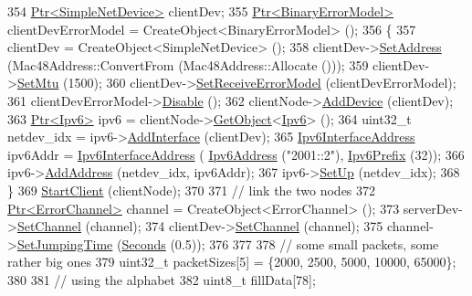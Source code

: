 \begin{DoxyCode}
354   \hyperlink{classns3_1_1Ptr}{Ptr<SimpleNetDevice>} clientDev;
355   \hyperlink{classns3_1_1Ptr}{Ptr<BinaryErrorModel>} clientDevErrorModel = CreateObject<BinaryErrorModel> ();
356   \{
357     clientDev = CreateObject<SimpleNetDevice> ();
358     clientDev->\hyperlink{classns3_1_1SimpleNetDevice_a968ef3e7318bac29d5f1d7d977029af4}{SetAddress} (Mac48Address::ConvertFrom (Mac48Address::Allocate ()));
359     clientDev->\hyperlink{classns3_1_1SimpleNetDevice_ab41676e626a91832291bcfbd55ee454a}{SetMtu} (1500);
360     clientDev->\hyperlink{classns3_1_1SimpleNetDevice_a8674cbc75fa8504bbf6c27b2ca1f5129}{SetReceiveErrorModel} (clientDevErrorModel);
361     clientDevErrorModel->\hyperlink{classns3_1_1ErrorModel_a55d35a3e713c31f650577e9f96cf25c0}{Disable} ();
362     clientNode->\hyperlink{classns3_1_1Node_a42ff83ee1d5d1649c770d3f5b62375de}{AddDevice} (clientDev);
363     \hyperlink{classns3_1_1Ptr}{Ptr<Ipv6>} ipv6 = clientNode->\hyperlink{classns3_1_1Object_a13e18c00017096c8381eb651d5bd0783}{GetObject}<\hyperlink{classns3_1_1Ipv6}{Ipv6}> ();
364     uint32\_t netdev\_idx = ipv6->\hyperlink{classns3_1_1Ipv6_a4fd7da82c16b8abf9ca15f982918e6a4}{AddInterface} (clientDev);
365     \hyperlink{classns3_1_1Ipv6InterfaceAddress}{Ipv6InterfaceAddress} ipv6Addr = \hyperlink{classns3_1_1Ipv6InterfaceAddress}{Ipv6InterfaceAddress} (
      \hyperlink{classns3_1_1Ipv6Address}{Ipv6Address} (\textcolor{stringliteral}{"2001::2"}), \hyperlink{classns3_1_1Ipv6Prefix}{Ipv6Prefix} (32));
366     ipv6->\hyperlink{classns3_1_1Ipv6_a5cd576e83cf65445be3a0b5ffd1ddc5c}{AddAddress} (netdev\_idx, ipv6Addr);
367     ipv6->\hyperlink{classns3_1_1Ipv6_a8e61d85ec7fd342ed38fef2d040ed1b9}{SetUp} (netdev\_idx);
368   \}
369   \hyperlink{classIpv6FragmentationTest_afe87fca4651780b7210efb45a77eadff}{StartClient} (clientNode);
370 
371   \textcolor{comment}{// link the two nodes}
372   \hyperlink{classns3_1_1Ptr}{Ptr<ErrorChannel>} channel = CreateObject<ErrorChannel> ();
373   serverDev->\hyperlink{classns3_1_1SimpleNetDevice_af9e9828ad584b5ba538f18f645f162e0}{SetChannel} (channel);
374   clientDev->\hyperlink{classns3_1_1SimpleNetDevice_af9e9828ad584b5ba538f18f645f162e0}{SetChannel} (channel);
375   channel->\hyperlink{classns3_1_1ErrorChannel_a907fdc086d939d84eb4e612d0eac1d84}{SetJumpingTime} (\hyperlink{group__timecivil_ga33c34b816f8ff6628e33d5c8e9713b9e}{Seconds} (0.5));
376 
377 
378   \textcolor{comment}{// some small packets, some rather big ones}
379   uint32\_t packetSizes[5] = \{2000, 2500, 5000, 10000, 65000\};
380 
381   \textcolor{comment}{// using the alphabet}
382   uint8\_t fillData[78];

\end{DoxyCode}
